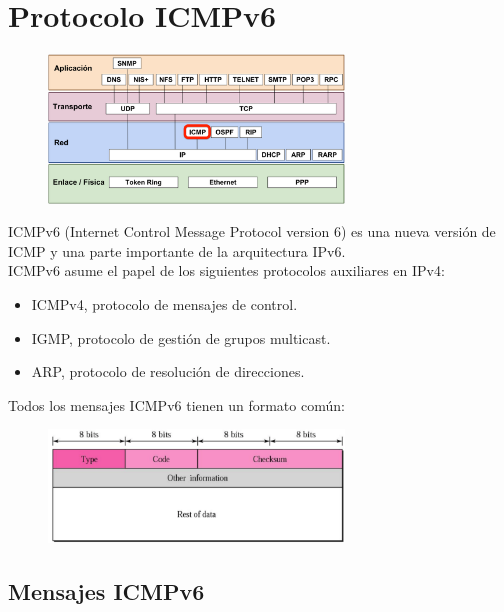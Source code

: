 \section{Protocolo ICMPv6}
\begin{figure}[H]
    \centering \includegraphics[width=0.7\textwidth]{img/ICMP.png}
\end{figure}
ICMPv6 (Internet Control Message Protocol version 6) es una nueva versión de ICMP y una parte importante de la arquitectura IPv6.\\

ICMPv6 asume el papel de los siguientes protocolos auxiliares en IPv4:
\begin{itemize}
    \item ICMPv4, protocolo de mensajes de control.
    \item IGMP, protocolo de gestión de grupos multicast.
    \item ARP, protocolo de resolución de direcciones.
\end{itemize}
Todos los mensajes ICMPv6 tienen un formato común:
\begin{figure}[H]
    \centering \includegraphics[width=0.7\textwidth]{img/ICMPv6_format.png}
\end{figure}
\subsection{Mensajes ICMPv6}
